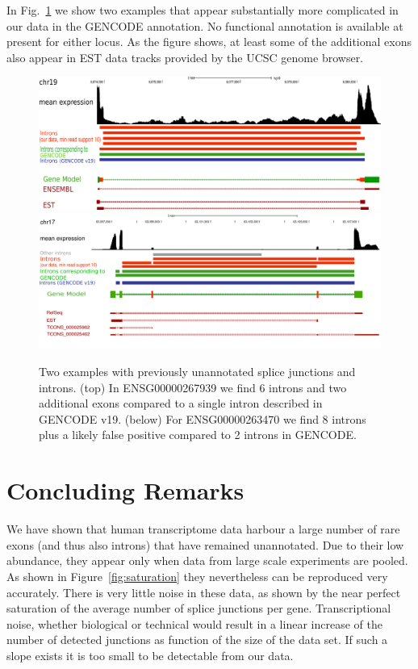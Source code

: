 \documentclass[ncrna,article,submit,moreauthors,pdftex,10pt,a4paper]{mdpi}
\begin{document}
In Fig.~\ref{fig:examples} we show two examples that appear substantially
more complicated in our data in the GENCODE annotation. No functional
annotation is available at present for either locus. As the figure shows,
at least some of the additional exons also appear in EST data tracks
provided by the UCSC genome browser. 

\begin{figure}[t]
\begin{center}
\includegraphics[width=\textwidth]{267939.pdf}\\[1em]
\includegraphics[width=\textwidth]{example.pdf}
\end{center}
\caption{Two examples with previously unannotated splice junctions and
  introns.  (top) In ENSG00000267939 we find 6 introns and two additional
  exons compared to a single intron described in GENCODE v19.  (below) For
  ENSG00000263470 we find 8 introns plus a likely false positive compared
  to 2 introns in GENCODE.}
\label{fig:examples} 
\end{figure}

\section{Concluding Remarks} 

We have shown that human transcriptome data harbour a large number of rare
exons (and thus also introns) that have remained unannotated. Due to their
low abundance, they appear only when data from large scale experiments are
pooled. As shown in Figure~\ref{fig:saturation} they nevertheless can be
reproduced very accurately. There is very little noise in these data, as
shown by the near perfect saturation of the average number of splice
junctions per gene. Transcriptional noise, whether biological or technical
would result in a linear increase of the number of detected junctions as
function of the size of the data set. If such a slope exists it is too
small to be detectable from our data. 
\end{document}
